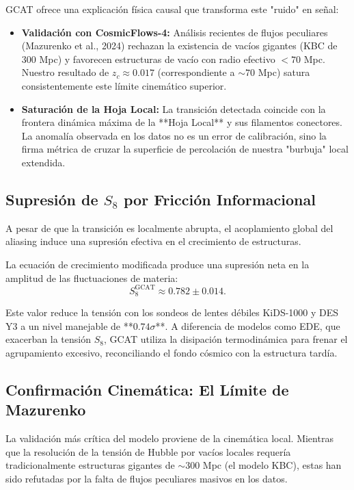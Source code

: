 \documentclass[12pt, a4paper]{article}
\theoremstyle{plain}
\theoremstyle{definition}
\begin{document}
GCAT ofrece una explicación física causal que transforma este "ruido" en señal:
\begin{itemize}
    \item \textbf{Validación con CosmicFlows-4:} Análisis recientes de flujos peculiares (Mazurenko et al., 2024) rechazan la existencia de vacíos gigantes (KBC de 300 Mpc) y favorecen estructuras de vacío con radio efectivo $< 70$ Mpc. Nuestro resultado de $z_c \approx 0.017$ (correspondiente a $\sim 70$ Mpc) satura consistentemente este límite cinemático superior.
    
    \item \textbf{Saturación de la Hoja Local:} La transición detectada coincide con la frontera dinámica máxima de la **Hoja Local** y sus filamentos conectores. La anomalía observada en los datos no es un error de calibración, sino la firma métrica de cruzar la superficie de percolación de nuestra "burbuja" local extendida.
\end{itemize}

\subsection{Supresión de $S_8$ por Fricción Informacional}

A pesar de que la transición es localmente abrupta, el acoplamiento global del aliasing induce una supresión efectiva en el crecimiento de estructuras.

La ecuación de crecimiento modificada produce una supresión neta en la amplitud de las fluctuaciones de materia:
\begin{equation}
S_8^{\text{GCAT}} \approx 0.782 \pm 0.014.
\end{equation}

Este valor reduce la tensión con los sondeos de lentes débiles KiDS-1000 y DES Y3 \cite{KiDS2021, DES2022} a un nivel manejable de **$0.74\sigma$**. A diferencia de modelos como EDE, que exacerban la tensión $S_8$, GCAT utiliza la disipación termodinámica para frenar el agrupamiento excesivo, reconciliando el fondo cósmico con la estructura tardía.

\subsection{Confirmación Cinemática: El Límite de Mazurenko}

La validación más crítica del modelo proviene de la cinemática local. Mientras que la resolución de la tensión de Hubble por vacíos locales requería tradicionalmente estructuras gigantes de $\sim 300$ Mpc (el modelo KBC), estas han sido refutadas por la falta de flujos peculiares masivos en los datos.
\end{document}
